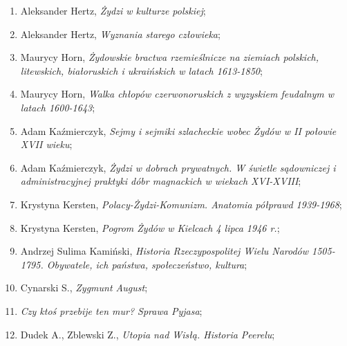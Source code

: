 \documentclass[a4paper,11pt]{article}
\begin{document}
\begin{enumerate}
\item Aleksander Hertz, \textit{Żydzi w kulturze polskiej};



\item Aleksander Hertz, \textit{Wyznania starego człowieka};



\item Maurycy Horn, \textit{Żydowskie bractwa rzemieślnicze na ziemiach
    polskich, litewskich, białoruskich i ukraińskich w latach
    1613-1850};



\item Maurycy Horn, \textit{Walka chłopów czerwonoruskich z wyzyskiem
    feudalnym w latach 1600-1643};



\item Adam Kaźmierczyk, \textit{Sejmy i sejmiki szlacheckie wobec Żydów
    w II połowie XVII wieku};



\item Adam Kaźmierczyk, \textit{Żydzi w dobrach prywatnych. W świetle
    sądowniczej i administracyjnej praktyki dóbr magnackich w wiekach
    XVI-XVIII};



\item Krystyna Kersten, \textit{Polacy-Żydzi-Komunizm. Anatomia półprawd
    1939-1968};



\item Krystyna Kersten, \textit{Pogrom Żydów w Kielcach 4 lipca 1946
    r.};



\item Andrzej Sulima Kamiński, \textit{Historia Rzeczypospolitej Wielu
    Narodów 1505-1795. Obywatele, ich państwa, społeczeństwo,
    kultura};



\item Cynarski S., \textit{Zygmunt August};



\item \textit{Czy ktoś przebije ten mur? Sprawa Pyjasa};



\item Dudek A., Zblewski Z., \textit{Utopia nad Wisłą. Historia
    Peerelu};




\end{enumerate}
\end{document}
